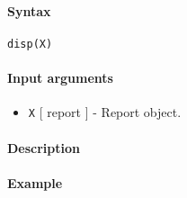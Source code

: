 


	\paragraph{Syntax}

\begin{verbatim}
disp(X)
\end{verbatim}

\paragraph{Input arguments}

\begin{itemize}
\itemsep1pt\parskip0pt
\item
  \texttt{X} {[} report {]} - Report object.
\end{itemize}

\paragraph{Description}

\paragraph{Example}


